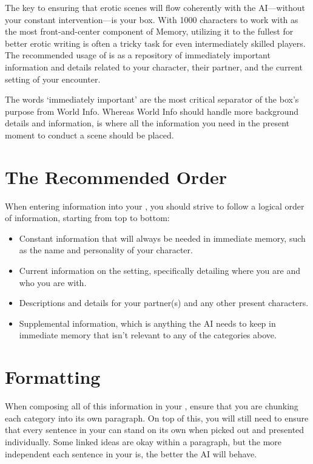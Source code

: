 ﻿\documentclass[Coomer-main.tex]{subfiles}
\begin{document}
The key to ensuring that erotic scenes will flow coherently with the AI—without your constant intervention—is your \rem box.
With 1000 characters to work with as the most front-and-center component of Memory, utilizing it to the fullest for better erotic writing is often a tricky task for even intermediately skilled players.
The recommended usage of \rem is as a repository of immediately important information and details related to your character, their partner, and the current setting of your encounter.

The words ‘immediately important’ are the most critical separator of the \rem box's purpose from World Info.
Whereas World Info should handle more background details and information, \rem is where all the information you need in the present moment to conduct a scene should be placed.

\section{The Recommended Order}

When entering information into your \rem, you should strive to follow a logical order of information, starting from top to bottom:

\begin{itemize}
	
\item Constant information that will always be needed in immediate memory, such as the name and personality of your character.

\item Current information on the setting, specifically detailing where you are and who you are with.

\item Descriptions and details for your partner(s) and any other present characters.

\item Supplemental information, which is anything the AI needs to keep in immediate memory that isn't relevant to any of the categories above.

\end{itemize}

\section{Formatting}

When composing all of this information in your \rem, ensure that you are chunking each category into its own paragraph.
On top of this, you will still need to ensure that every sentence in your \rem can stand on its own when picked out and presented individually.
Some linked ideas are okay within a paragraph, but the more independent each sentence in your \rem is, the better the AI will behave.
\end{document}

